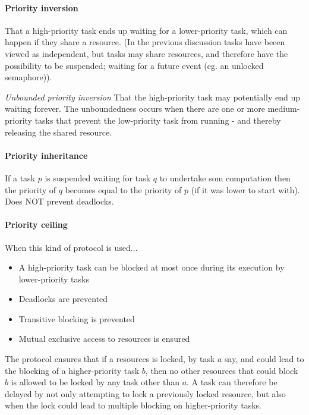 \paragraph{Priority inversion} That a high-priority task ends up waiting for a lower-priority task, which can happen if they share a resource. (In the previous discussion tasks have beeen viewed as independent, but tasks may share resources, and therefore have the possibility to be suspended; waiting for a future event (eg. an unlocked semaphore)).

\textit{Unbounded priority inversion} That the high-priority task may potentially end up waiting forever. The unboundedness occurs when there are one or more medium-priority tasks that prevent the low-priority task from running - and thereby releasing the shared resource.

\paragraph{Priority inheritance} If a task $p$ is suspended waiting for task $q$ to undertake som computation then the priority of $q$ becomes equal to the priority of $p$ (if it was lower to start with). Does NOT prevent deadlocks.

\paragraph{Priority ceiling} When this kind of protocol is used...
\begin{itemize}[nolistsep,noitemsep]
  \item A high-priority task can be blocked at most once during its execution by lower-priority tasks
  \item Deadlocks are prevented
  \item Transitive blocking is prevented
  \item Mutual exclusive access to resources is ensured
\end{itemize}

The protocol ensures that if a resources is locked, by task $a$ say, and could lead to the blocking of a higher-priority task $b$, then no other resources that could block $b$ is allowed to be locked by any task other than $a$. A task can therefore be delayed by not only attempting to lock a previously locked resource, but also when the lock could lead to multiple blocking on higher-priority tasks.

